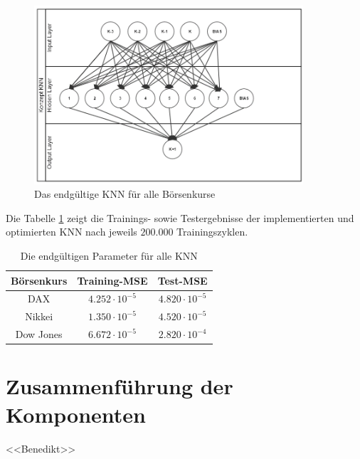 \begin{figure}[H]
	\centering
	\includegraphics[width=10cm]{FertigKNN.PNG}
	\caption{Das endgültige KNN für alle Börsenkurse}
	\label{fig:ENDKNN}
\end{figure}

Die Tabelle \ref{tab:ENDval} zeigt die Trainings- sowie Testergebnisse der implementierten und optimierten KNN nach jeweils $200.000$ Trainingszyklen.

\begin{table}[H]
  \centering
  \begin{tabular}{|c|c|c|}
  \hline 
  \rule[0ex]{0pt}{2.5ex}  Börsenkurs & Training-MSE & Test-MSE\\ 
  \hline 
  \rule[0ex]{0pt}{2.5ex} DAX & $4.252\cdot10^{-5}$ & $4.820\cdot10^{-5}$  \\ 
  \hline 
  \rule[0ex]{0pt}{2.5ex} Nikkei & $1.350\cdot10^{-5}$ & $4.520\cdot10^{-5}$  \\ 
  \hline 
   \rule[0ex]{0pt}{2.5ex} Dow Jones & $6.672\cdot10^{-5}$ & $2.820\cdot10^{-4}$  \\ 
  \hline 
  \end{tabular} 
  \caption{Die endgültigen Parameter für alle KNN}
  \label{tab:ENDval}
\end{table}

\section{Zusammenführung der Komponenten}
\label{section:Zusammenführung der Komponenten}
<<Benedikt>> \Blindtext
